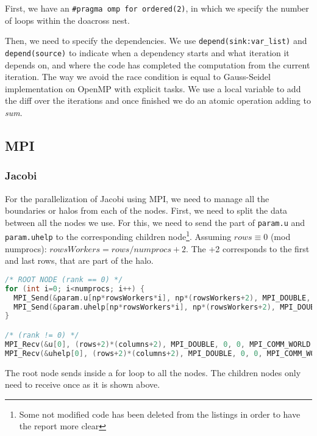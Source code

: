 \documentclass[a4paper, 10pt]{article}
\begin{document}
First, we have an \texttt{\#pragma omp for ordered(2)}, in which we specify the number of loops within the doacross nest. 

Then, we need to specify the dependencies. We use \texttt{depend(sink:var\_list)} and \texttt{depend(source)} to indicate when a dependency starts and what iteration it depends on, and where the code has completed the computation from the current iteration. The way we avoid the race condition is equal to Gauss-Seidel implementation on OpenMP with explicit tasks. We use a local variable to add the diff over the iterations and once finished we do an atomic operation adding to \textit{sum}.


\clearpage

\subsection{MPI}


\subsubsection{Jacobi}

For the parallelization of Jacobi using MPI, we need to manage all the boundaries or halos from each of the nodes. First, we need to split the data between all the nodes we use. For this, we need to send the part of \texttt{param.u} and \texttt{param.uhelp} to the corresponding children node\footnote{Some not modified code has been deleted from the listings in order to have the report more clear}. Assuming $rows \equiv 0 $ (mod numprocs): $rowsWorkers = rows / numprocs + 2$. The +2 corresponds to the first and last rows, that are part of the halo.

\begin{lstlisting}[language=c, caption={Sending/Receiving initial data to all nodes}]
/* ROOT NODE (rank == 0) */
for (int i=0; i<numprocs; i++) {
  MPI_Send(&param.u[np*rowsWorkers*i], np*(rowsWorkers+2), MPI_DOUBLE, i, 0, MPI_COMM_WORLD);
  MPI_Send(&param.uhelp[np*rowsWorkers*i], np*(rowsWorkers+2), MPI_DOUBLE, i, 0, MPI_COMM_WORLD);
}    

/* (rank != 0) */
MPI_Recv(&u[0], (rows+2)*(columns+2), MPI_DOUBLE, 0, 0, MPI_COMM_WORLD, &status);
MPI_Recv(&uhelp[0], (rows+2)*(columns+2), MPI_DOUBLE, 0, 0, MPI_COMM_WORLD, &status);
\end{lstlisting}

The root node sends inside a for loop to all the nodes. The children nodes only need to receive once as it is shown above.
\end{document}
